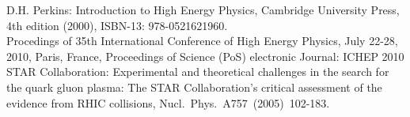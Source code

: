 \begin{thebibliography}{100}



  D.H. Perkins:  Introduction to High Energy Physics, Cambridge
University Press,\\ 4th edition (2000), ISBN-13: 978-0521621960.\\
Procedings of 35th International Conference of High Energy Physics,
July 22-28, 2010, Paris, France,
     Proceedings of Science (PoS) electronic Journal: ICHEP 2010
%
  STAR Collaboration: Experimental and theoretical challenges in
the search for the quark gluon plasma: The STAR Collaboration's
     critical assessment of the evidence from RHIC collisions,
     Nucl.~Phys.~A757~(2005)~102-183.


\end{thebibliography}
